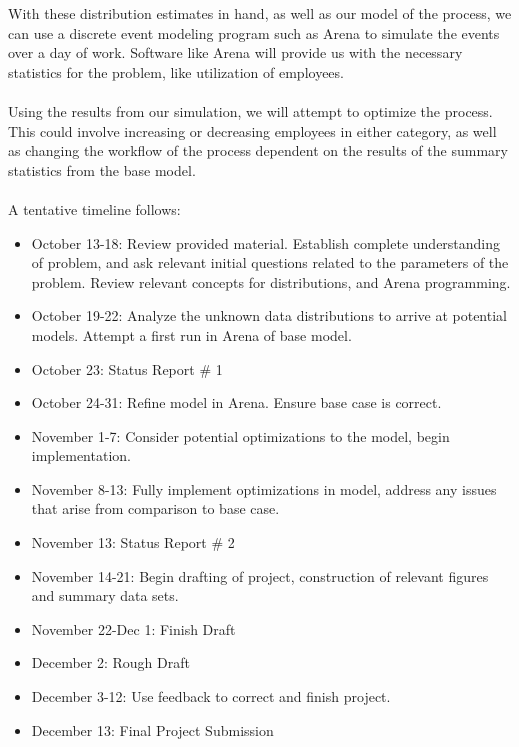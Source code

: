 \documentclass[letterpaper,10pt]{article}
\begin{document}
With these distribution estimates in hand, as well as our model of the process, we can use a discrete event modeling program such as Arena to simulate the events over a day of work. Software like Arena will provide us with the necessary statistics for the problem, like utilization of employees.\\\\
Using the results from our simulation, we will attempt to optimize the process. This could involve increasing or decreasing employees in either category, as well as changing the workflow of the process dependent on the results of the summary statistics from the base model.\\\\
A tentative timeline follows:\\
\begin{itemize}
\item October 13-18: Review provided material. Establish complete understanding of problem, and ask relevant initial questions related to the parameters of the problem. Review relevant concepts for distributions, and Arena programming.
\item October 19-22: Analyze the unknown data distributions to arrive at potential models. Attempt a first run in Arena of base model.
\item October 23: Status Report \# 1
\item October 24-31: Refine model in Arena. Ensure base case is correct.
\item November 1-7: Consider potential optimizations to the model, begin implementation.
\item November 8-13: Fully implement optimizations in model, address any issues that arise from comparison to base case.
\item November 13: Status Report \# 2
\item November 14-21: Begin drafting of project, construction of relevant figures and summary data sets.
\item November 22-Dec 1: Finish Draft
\item December 2: Rough Draft
\item December 3-12: Use feedback to correct and finish project.
\item December 13: Final Project Submission
\end{itemize}
\end{document}
